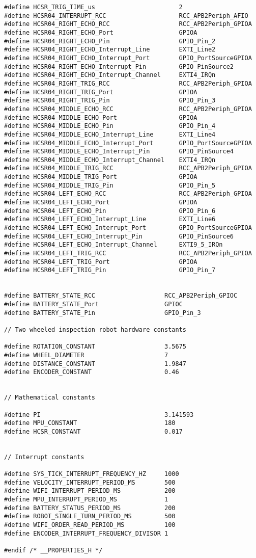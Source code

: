 \documentclass[a4paper,12pt,twoside,openany]{report}
\begin{document}
\begin{lstlisting}[style=customc]
#define HCSR_TRIG_TIME_us						2
#define HCSR04_INTERRUPT_RCC					RCC_APB2Periph_AFIO
#define HCSR04_RIGHT_ECHO_RCC					RCC_APB2Periph_GPIOA
#define HCSR04_RIGHT_ECHO_Port					GPIOA
#define HCSR04_RIGHT_ECHO_Pin					GPIO_Pin_2
#define HCSR04_RIGHT_ECHO_Interrupt_Line		EXTI_Line2
#define HCSR04_RIGHT_ECHO_Interrupt_Port		GPIO_PortSourceGPIOA
#define HCSR04_RIGHT_ECHO_Interrupt_Pin			GPIO_PinSource2
#define HCSR04_RIGHT_ECHO_Interrupt_Channel		EXTI4_IRQn
#define HCSR04_RIGHT_TRIG_RCC					RCC_APB2Periph_GPIOA
#define HCSR04_RIGHT_TRIG_Port					GPIOA
#define HCSR04_RIGHT_TRIG_Pin					GPIO_Pin_3
#define HCSR04_MIDDLE_ECHO_RCC					RCC_APB2Periph_GPIOA
#define HCSR04_MIDDLE_ECHO_Port					GPIOA
#define HCSR04_MIDDLE_ECHO_Pin					GPIO_Pin_4
#define HCSR04_MIDDLE_ECHO_Interrupt_Line		EXTI_Line4
#define HCSR04_MIDDLE_ECHO_Interrupt_Port		GPIO_PortSourceGPIOA
#define HCSR04_MIDDLE_ECHO_Interrupt_Pin		GPIO_PinSource4
#define HCSR04_MIDDLE_ECHO_Interrupt_Channel	EXTI4_IRQn
#define HCSR04_MIDDLE_TRIG_RCC					RCC_APB2Periph_GPIOA
#define HCSR04_MIDDLE_TRIG_Port					GPIOA
#define HCSR04_MIDDLE_TRIG_Pin					GPIO_Pin_5
#define HCSR04_LEFT_ECHO_RCC					RCC_APB2Periph_GPIOA
#define HCSR04_LEFT_ECHO_Port					GPIOA
#define HCSR04_LEFT_ECHO_Pin					GPIO_Pin_6
#define HCSR04_LEFT_ECHO_Interrupt_Line			EXTI_Line6
#define HCSR04_LEFT_ECHO_Interrupt_Port			GPIO_PortSourceGPIOA
#define HCSR04_LEFT_ECHO_Interrupt_Pin			GPIO_PinSource6
#define HCSR04_LEFT_ECHO_Interrupt_Channel		EXTI9_5_IRQn
#define HCSR04_LEFT_TRIG_RCC					RCC_APB2Periph_GPIOA
#define HCSR04_LEFT_TRIG_Port					GPIOA
#define HCSR04_LEFT_TRIG_Pin					GPIO_Pin_7


#define BATTERY_STATE_RCC					RCC_APB2Periph_GPIOC
#define BATTERY_STATE_Port					GPIOC
#define BATTERY_STATE_Pin					GPIO_Pin_3

// Two wheeled inspection robot hardware constants

#define ROTATION_CONSTANT 					3.5675
#define WHEEL_DIAMETER 						7
#define DISTANCE_CONSTANT 					1.9847
#define ENCODER_CONSTANT 					0.46


// Mathematical constants

#define PI 									3.141593
#define MPU_CONSTANT 						180
#define HCSR_CONSTANT						0.017


// Interrupt constants

#define SYS_TICK_INTERRUPT_FREQUENCY_HZ		1000
#define VELOCITY_INTERRUPT_PERIOD_MS 		500
#define WIFI_INTERRUPT_PERIOD_MS 			200
#define MPU_INTERRUPT_PERIOD_MS 			1
#define BATTERY_STATUS_PERIOD_MS			200
#define ROBOT_SINGLE_TURN_PERIOD_MS			500
#define WIFI_ORDER_READ_PERIOD_MS			100
#define ENCODER_INTERRUPT_FREQUENCY_DIVISOR 1

#endif /* __PROPERTIES_H */

\end{lstlisting}
\end{document}
